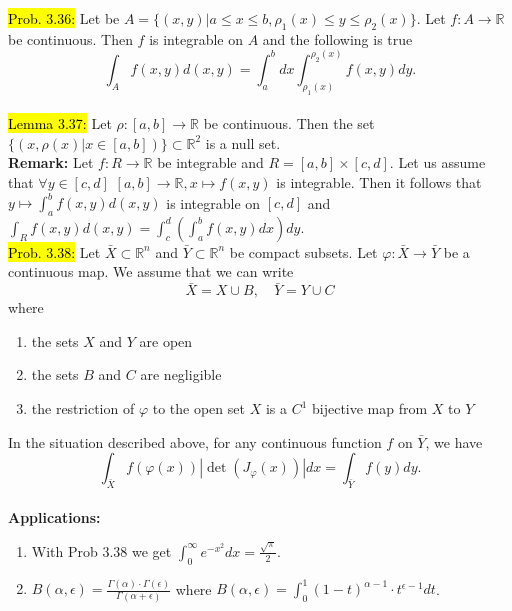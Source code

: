 \documentclass[10pt,landscape]{article}
\newcommand{\green}[1]{\sethlcolor{green}\hl{#1}}
\newcommand{\yellow}[1]{\sethlcolor{yellow} \hl{#1}}
\begin{document}
\begin{multicols}{3}
\yellow{Prob. 3.36:} Let be $A = \{(x,y) | a \leq x \leq b, \rho_1(x) \leq y \leq \rho_2(x) \}$. Let $f: A \rightarrow \mathbb{R}$ be continuous. Then $f$ is integrable on $A$ and the following is true
$$
\int_Af(x,y) d(x,y) = \int_{a}^b dx \int_{\rho_1(x)}^{\rho_2(x)}f(x,y)dy.
$$\\
\green{Lemma 3.37:} Let $\rho: [a,b] \rightarrow \mathbb{R}$ be continuous. Then the set $\{(x, \rho(x) | x \in [a,b])\} \subset \mathbb{R}^2$ is a null set.\\
\textbf{Remark:} Let $f: R \rightarrow \mathbb{R}$ be integrable and $R = [a,b] \times [c,d]$. Let us assume that $\forall y \in [c,d]$ $[a,b] \rightarrow \mathbb{R}, x \mapsto f(x,y)$ is integrable. 
Then it follows that $y \mapsto \int_a^b f(x,y)d(x,y)$ is integrable on $[c,d]$ and $\int_R f(x,y)d(x,y) = \int_c^d(\int_a^b f(x,y)dx)dy$.\\
\yellow{Prob. 3.38:} 
Let $\bar{X} \subset \mathbb{R}^{n}$ and $\bar{Y} \subset \mathbb{R}^{n}$ be compact subsets. Let $\varphi: \bar{X} \rightarrow \bar{Y}$ be a continuous map. We assume that we can write
$$
\bar{X}=X \cup B, \quad \bar{Y}=Y \cup C
$$
where
\begin{enumerate}
        \item the sets $X$ and $Y$ are open
        \item the sets $B$ and $C$ are negligible
        \item the restriction of $\varphi$ to the open set $X$ is a $C^{1}$ bijective map from $X$ to $Y$
\end{enumerate}
In the situation described above, for any continuous function $f$ on $\bar{Y}$, we have
$$
\int_{\bar{X}} f(\varphi(x))\left|\operatorname{det}\left(J_{\varphi}(x)\right)\right| d x=\int_{\bar{Y}} f(y) d y .
$$\\
\textbf{Applications:} 
\begin{enumerate}
        \item With Prob 3.38 we get $\int_0^{\infty}e^{-x^2}dx = \frac{\sqrt{\pi}}{2}$.
        \item $B(\alpha, \epsilon) = \frac{\Gamma(\alpha) \cdot \Gamma(\epsilon)}{\Gamma(\alpha + \epsilon)}$ where $B(\alpha, \epsilon) = \int_0^1(1 - t)^{\alpha - 1} \cdot t^{\epsilon - 1} dt$.
\end{enumerate}


\end{multicols}
\end{document}
